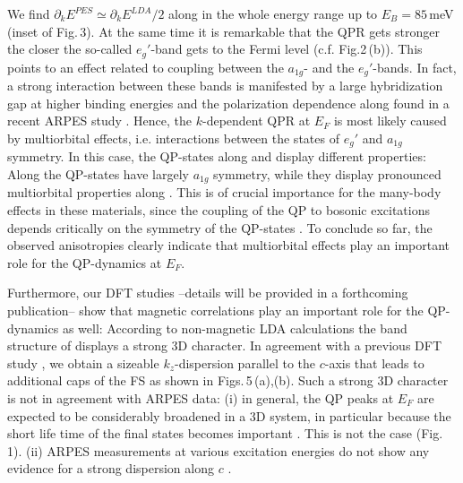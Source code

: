 \documentclass[preprint,showpacs,preprintnumbers,amsmath,amssymb,twoside,aps]{revtex4}
\begin{document}
We find $\partial_k E^{PES}\simeq \partial_k E^{LDA}/2$ along \GK \/ in the whole energy range up to $E_B=85$\,meV (inset of Fig.\,3).
%
At the same time it is remarkable that the QPR gets stronger the closer the so-called $e_g'$-band gets to the Fermi level (c.f. Fig.2\,(b)). This
points to an effect related to coupling between the $a_{1g}$- and the $e_g'$-bands. In fact, a strong interaction between these bands is manifested
by a large hybridization gap at higher binding energies  and the polarization dependence along \GK\/ found in a recent ARPES study \cite{QianPRL06b}.
%
Hence, the $k$-dependent QPR at $E_F$ is most likely caused by multiorbital effects, i.e. interactions between the states of $e_g'$ and $a_{1g}$
symmetry. In this case, the QP-states along \GM\/ and \GK\/ display different properties: Along \GM\/ the QP-states have largely $a_{1g}$ symmetry,
while they display pronounced multiorbital properties along \GK . This is of crucial importance for the many-body effects in these materials, since
the coupling of the QP to bosonic excitations depends critically on the symmetry of the QP-states \cite{DevereauxPRL04}.
%
To conclude so far, the observed anisotropies clearly indicate that multiorbital effects play an important role for the QP-dynamics at $E_F$.




Furthermore, our DFT studies --details will be provided in a forthcoming publication-- show that %
magnetic correlations play an important role for the QP-dynamics as well: According to non-magnetic LDA calculations the band structure of \NCOc\/
displays a strong 3D character. In agreement with a previous DFT study \cite{JohannesEPL04}, we obtain a sizeable $k_z$-dispersion parallel to the
$c$-axis that leads to additional caps of the FS as shown in Figs.\,5\,(a),(b). Such a strong 3D character is not in agreement with ARPES data: (i)
in general, the QP peaks at $E_F$ are expected to be considerably broadened in a 3D system, in particular because the short life time of the final
states becomes important \cite{StarnbergPRB93}. This is not the case (Fig.\,1). (ii) ARPES measurements at various excitation energies do not show
any evidence for a strong dispersion along $c$ \cite{QianPRL06b}.
\end{document}
